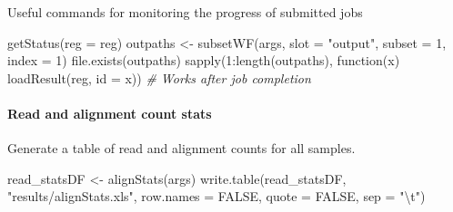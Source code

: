 \documentclass[14pt,]{article}
\newcommand{\hlnum}[1]{\textcolor[rgb]{0.816,0.125,0.439}{#1}}%
\newcommand{\hlstr}[1]{\textcolor[rgb]{0.251,0.627,0.251}{#1}}%
\newcommand{\hlcom}[1]{\textcolor[rgb]{0.502,0.502,0.502}{\textit{#1}}}%
\newcommand{\hlopt}[1]{\textcolor[rgb]{0,0,0}{#1}}%
\newcommand{\hlstd}[1]{\textcolor[rgb]{0.251,0.251,0.251}{#1}}%
\newcommand{\hlkwc}[1]{\textcolor[rgb]{0.251,0.251,0.251}{#1}}%
\newcommand{\hlkwd}[1]{\textcolor[rgb]{0.878,0.439,0.125}{#1}}%
\newenvironment{Shaded}{\begin{myshaded}}{\end{myshaded}}
\newcommand{\KeywordTok}[1]{\hlkwd{#1}}
\newcommand{\DataTypeTok}[1]{\hlkwc{#1}}
\newcommand{\DecValTok}[1]{\hlnum{#1}}
\newcommand{\CharTok}[1]{\hlstr{#1}}
\newcommand{\StringTok}[1]{\hlstr{#1}}
\newcommand{\CommentTok}[1]{\hlcom{#1}}
\newcommand{\OtherTok}[1]{{#1}}
\newcommand{\ControlFlowTok}[1]{\hlkwd{#1}}
\newcommand{\OperatorTok}[1]{\hlopt{#1}}
\newcommand{\NormalTok}[1]{\hlstd{#1}}
\begin{document}
\begin{Shaded}
\end{Shaded}

Useful commands for monitoring the progress of submitted jobs

\begin{Shaded}
\begin{Highlighting}[]
\KeywordTok{getStatus}\NormalTok{(}\DataTypeTok{reg =}\NormalTok{ reg)}
\NormalTok{outpaths <-}\StringTok{ }\KeywordTok{subsetWF}\NormalTok{(args, }\DataTypeTok{slot =} \StringTok{"output"}\NormalTok{, }\DataTypeTok{subset =} \DecValTok{1}\NormalTok{, }\DataTypeTok{index =} \DecValTok{1}\NormalTok{)}
\KeywordTok{file.exists}\NormalTok{(outpaths)}
\KeywordTok{sapply}\NormalTok{(}\DecValTok{1}\OperatorTok{:}\KeywordTok{length}\NormalTok{(outpaths), }\ControlFlowTok{function}\NormalTok{(x) }\KeywordTok{loadResult}\NormalTok{(reg, }\DataTypeTok{id =}\NormalTok{ x))  }\CommentTok{# Works after job completion}
\end{Highlighting}
\end{Shaded}

\hypertarget{read-and-alignment-count-stats}{%
\paragraph{Read and alignment count stats}\label{read-and-alignment-count-stats}}

Generate a table of read and alignment counts for all samples.

\begin{Shaded}
\begin{Highlighting}[]
\NormalTok{read_statsDF <-}\StringTok{ }\KeywordTok{alignStats}\NormalTok{(args)}
\KeywordTok{write.table}\NormalTok{(read_statsDF, }\StringTok{"results/alignStats.xls"}\NormalTok{, }\DataTypeTok{row.names =} \OtherTok{FALSE}\NormalTok{, }\DataTypeTok{quote =} \OtherTok{FALSE}\NormalTok{, }
    \DataTypeTok{sep =} \StringTok{"}\CharTok{\textbackslash{}t}\StringTok{"}\NormalTok{)}
\end{Highlighting}
\end{Shaded}
\end{document}
